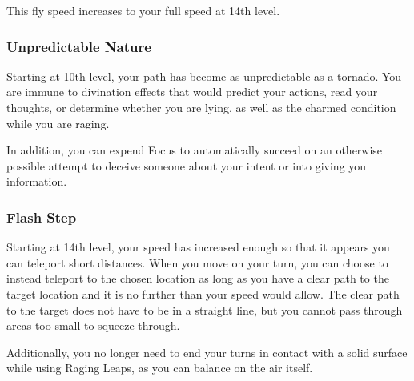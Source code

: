 This fly speed increases to your full speed at 14th level.

\subsubsection{Unpredictable Nature}
Starting at 10th level, your path has become as unpredictable as a tornado. You are immune to divination effects that would predict your actions, read your thoughts, or determine whether you are lying, as well as the charmed condition while you are raging.

In addition, you can expend Focus to automatically succeed on an otherwise possible attempt to deceive someone about your intent or into giving you information.

\subsubsection{Flash Step}
Starting at 14th level, your speed has increased enough so that it appears you can teleport short distances. When you move on your turn, you can choose to instead teleport to the chosen location as long as you have a clear path to the target location and it is no further than your speed would allow. The clear path to the target does not have to be in a straight line, but you cannot pass through areas too small to squeeze through.

Additionally, you no longer need to end your turns in contact with a solid surface while using Raging Leaps, as you can balance on the air itself.